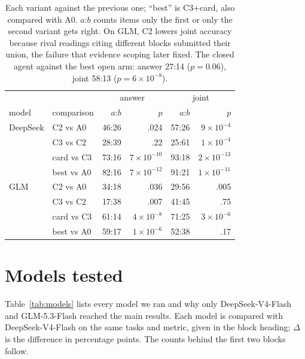\documentclass[11pt]{article}%
\begin{document}
\begin{table}[h]
\centering
\scriptsize
\setlength{\tabcolsep}{2pt}
\begin{tabularx}{\columnwidth}{@{}l>{\raggedright\arraybackslash}Xrrrr@{}}
\toprule
& & \multicolumn{2}{c}{answer} & \multicolumn{2}{c}{joint} \\
model & comparison & $a$:$b$ & $p$ & $a$:$b$ & $p$ \\
\midrule
DeepSeek & \textsc{C2} vs \textsc{A0}   & 46:26 & .024 & 57:26 & $9{\times}10^{-4}$ \\
         & \textsc{C3} vs \textsc{C2}   & 28:39 & .22  & 25:61 & $1{\times}10^{-4}$ \\
         & card vs \textsc{C3}          & 73:16 & $7{\times}10^{-10}$ & 93:18 & $2{\times}10^{-13}$ \\
         & best vs \textsc{A0}          & 82:16 & $7{\times}10^{-12}$ & 91:21 & $1{\times}10^{-11}$ \\
\midrule
GLM      & \textsc{C2} vs \textsc{A0}   & 34:18 & .036 & 29:56 & .005 \\
         & \textsc{C3} vs \textsc{C2}   & 17:38 & .007 & 41:45 & .75 \\
         & card vs \textsc{C3}          & 61:14 & $4{\times}10^{-8}$ & 71:25 & $3{\times}10^{-6}$ \\
         & best vs \textsc{A0}          & 59:17 & $1{\times}10^{-6}$ & 52:38 & .17 \\
\bottomrule
\end{tabularx}
\caption{Each variant against the previous one; ``best'' is \textsc{C3}+card, also
compared with \textsc{A0}. $a$:$b$ counts items only the first or only the
second variant gets right. On GLM,
\textsc{C2} lowers joint accuracy because rival readings citing different
blocks submitted their union, the failure that evidence scoping later fixed.
The closed agent against the best open arm: answer 27:14 ($p=0.06$), joint
58:13 ($p=6{\times}10^{-8}$).}
\end{table}

\section{Models tested}
\label{app:sweep}

Table~\ref{tab:models} lists every model we ran and why only DeepSeek-V4-Flash
and GLM-5.3-Flash reached the main results. Each model is compared with
DeepSeek-V4-Flash on the same tasks and metric, given in the block heading;
$\Delta$ is the difference in percentage points. The counts behind the first
two blocks follow.
\end{document}
